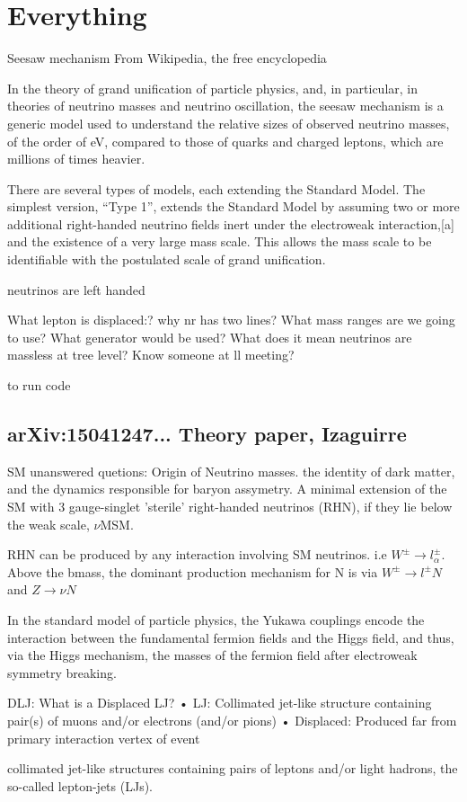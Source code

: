 \chapter{Everything}
\label{ch:allandall}

Seesaw mechanism
From Wikipedia, the free encyclopedia

In the theory of grand unification of particle physics, and, in particular, in theories of neutrino masses and neutrino oscillation, the seesaw mechanism is a generic model used to understand the relative sizes of observed neutrino masses, of the order of eV, compared to those of quarks and charged leptons, which are millions of times heavier.

There are several types of models, each extending the Standard Model. The simplest version, “Type 1”, extends the Standard Model by assuming two or more additional right-handed neutrino fields inert under the electroweak interaction,[a] and the existence of a very large mass scale. This allows the mass scale to be identifiable with the postulated scale of grand unification.

neutrinos are left handed

What lepton is displaced:?
why nr has two lines?
What mass ranges are we going to use?
What generator would be used?
What does it mean neutrinos are massless at tree level?
Know someone at ll meeting?

to run code %

\section{arXiv:15041247... Theory paper, Izaguirre}
SM unanswered quetions: Origin of Neutrino masses. the identity of dark matter, and the dynamics responsible for baryon assymetry. A minimal extension of the SM with 3 gauge-singlet 'sterile' right-handed neutrinos (RHN), if they lie below the weak scale, $\nu$MSM.

RHN can be produced by any interaction involving SM neutrinos. i.e $W^{\pm} \to l^{\pm}_\alpha$. Above the bmass, the dominant production mechanism for N is via $W^{\pm} \to l^{\pm}N$ and $Z\to \nu N$

In the standard model of particle physics, the Yukawa couplings encode the interaction between the fundamental fermion fields and the Higgs field, and thus, via the Higgs mechanism, the masses of the fermion field after electroweak symmetry breaking.

DLJ: What is a Displaced LJ?
• LJ: Collimated jet-like structure containing pair(s) of muons
and/or electrons (and/or pions)
• Displaced: Produced far from primary interaction vertex of event

collimated jet-like structures containing pairs of leptons and/or light hadrons, the so-called lepton-jets (LJs).
